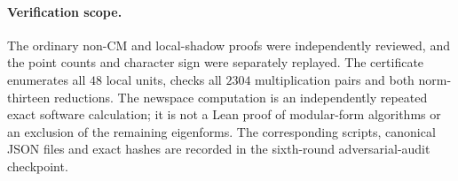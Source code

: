 \paragraph{Verification scope.}
The ordinary non-CM and local-shadow proofs were independently
reviewed, and the point counts and character sign were separately
replayed. The certificate enumerates all $48$ local units, checks all
$2304$ multiplication pairs and both norm-thirteen reductions. The
newspace computation is an independently repeated exact software
calculation; it is not a Lean proof of modular-form algorithms or an
exclusion of the remaining eigenforms. The corresponding scripts,
canonical JSON files and exact hashes are recorded in the sixth-round
adversarial-audit checkpoint.
